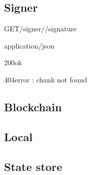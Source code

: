 
\subsection{Signer}\label{spec:api:signer}
% 

\UseRawInputEncoding
\begin{apiRoute}{GET}{/signer//}{signature}
 {
}
{ }
\begin{routeParameter} 
\end{routeParameter} \begin{routeResponse}{application/json}
\begin{routeResponseItem}{200}{ok} \begin{routeResponseItemBody}
\end{routeResponseItemBody} \end{routeResponseItem}
\begin{routeResponseItem}{404}{error : chunk not found}
\begin{routeResponseItemBody} 
\end{routeResponseItemBody} \end{routeResponseItem}
\end{routeResponse} \end{apiRoute}


\subsection{Blockchain \statusred}\label{spec:api:blockchain}
% 

\subsection{Local \statusred}\label{spec:api:local}
% 

\subsection{State store \statusred}\label{spec:api:statestore}
% 

